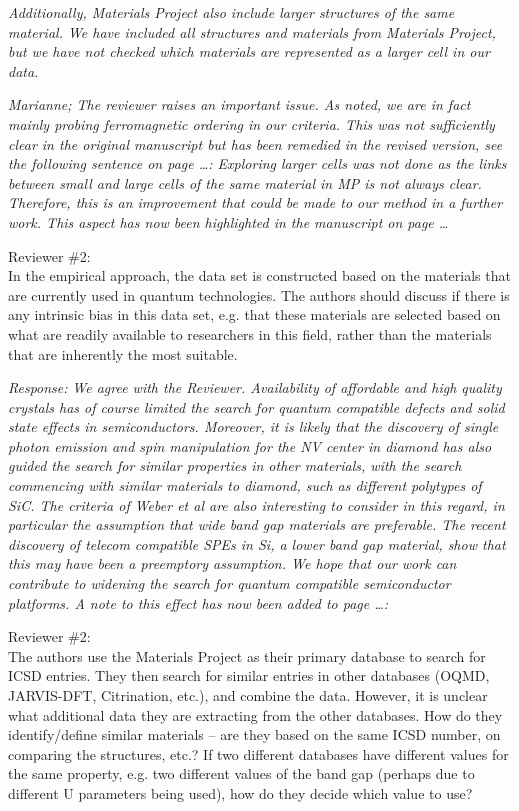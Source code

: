 \documentclass[11pt, a4paper]{letter} %
\begin{document}
\textit{Additionally, Materials Project also include larger structures of the same material. We have included all structures and materials from Materials Project, but we have not checked which materials are represented as a larger cell in our data.}

\textit{Marianne; The reviewer raises an important issue. As noted, we are in fact mainly probing ferromagnetic ordering in our criteria. This was not sufficiently clear in the original manuscript but has been remedied in the revised version, see the following sentence on page …: 
Exploring larger cells was not done as the links between small and large cells of the same material in MP is not always clear. Therefore, this is an improvement that could be made to our method in a further work. This aspect has now been highlighted in the manuscript on page … 
}

Reviewer \#2: \\
In the empirical approach, the data set is constructed based on the materials that are currently used in quantum technologies. The authors should discuss if there is any intrinsic bias in this data set, e.g. that these materials are selected based on what are readily available to researchers in this field, rather than the materials that are inherently the most suitable.

\textit{Response:}
\textit{We agree with the Reviewer. Availability of affordable and high quality crystals has of course limited the search for quantum compatible defects and solid state effects in semiconductors. Moreover, it is likely that the discovery of single photon emission and spin manipulation for the NV center in diamond has also guided the search for similar properties in other materials, with the search commencing with similar materials to diamond, such as different polytypes of SiC. The criteria of Weber et al are also interesting to consider in this regard, in particular the assumption that wide band gap materials are preferable. The recent discovery of telecom compatible SPEs in Si, a lower band gap material, show that this may have been a preemptory assumption. We hope that our work can contribute to widening the search for quantum compatible semiconductor platforms. 
A note to this effect has now been added to page …:  
}

Reviewer \#2: \\
The authors use the Materials Project as their primary database to search for ICSD entries. They then search for similar entries in other databases (OQMD, JARVIS-DFT, Citrination, etc.), and combine the data. However, it is unclear what additional data they are extracting from the other databases. How do they identify/define similar materials – are they based on the same ICSD number, on comparing the structures, etc.? If two different databases have different values for the same property, e.g. two different values of the band gap (perhaps due to different U parameters being used), how do they decide which value to use?
\end{document}
